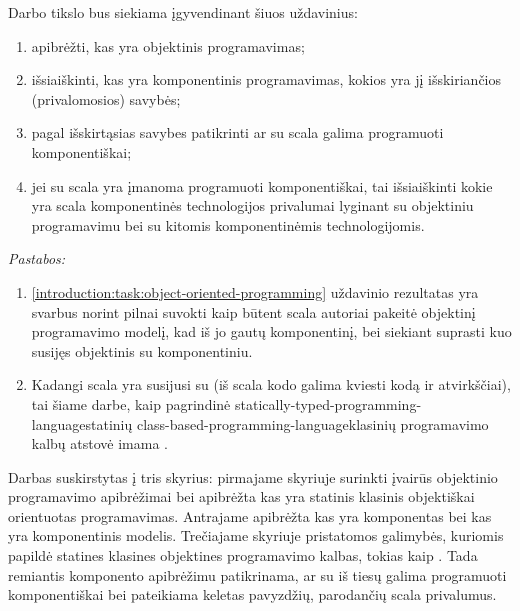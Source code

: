 Darbo tikslo bus siekiama įgyvendinant šiuos uždavinius:
\begin{enumerate}
  \item \label{introduction:task:object-oriented-programming}
    apibrėžti, kas yra objektinis programavimas;
  \item išsiaiškinti, kas yra komponentinis programavimas, kokios
    yra jį išskiriančios (privalomosios) savybės;
  \item pagal išskirtąsias savybes patikrinti ar su
    \gls{scala}{} galima programuoti komponentiškai;
  \item jei su \gls{scala}{} yra įmanoma programuoti
    komponentiškai, tai išsiaiškinti kokie yra
    \gls{scala}{} komponentinės technologijos
    privalumai lyginant su objektiniu programavimu bei su kitomis
    komponentinėmis technologijomis.
\end{enumerate}
\emph{Pastabos:}
\begin{enumerate}
  \item \ref{introduction:task:object-oriented-programming}
    uždavinio rezultatas yra svarbus norint pilnai suvokti kaip būtent
    \gls{scala}{} autoriai pakeitė objektinį programavimo
    modelį, kad iš jo gautų komponentinį, bei siekiant suprasti kuo
    susijęs objektinis su komponentiniu.
  \item Kadangi \gls{scala}{} yra susijusi su
     (iš \gls{scala}{} kodo galima
    kviesti  kodą ir atvirkščiai), tai šiame darbe,
    kaip pagrindinė \gls{statically-typed-programming-language}{statinių}
    \gls{class-based-programming-language}{klasinių}
     programavimo kalbų atstovė imama
    .
\end{enumerate}

Darbas suskirstytas į tris skyrius: pirmajame skyriuje surinkti
įvairūs objektinio programavimo apibrėžimai bei apibrėžta kas
yra statinis klasinis objektiškai orientuotas programavimas.
Antrajame apibrėžta kas yra komponentas bei kas yra komponentinis modelis.
Trečiajame skyriuje pristatomos galimybės, kuriomis 
papildė statines klasines objektines programavimo kalbas, tokias
kaip . Tada remiantis komponento apibrėžimu patikrinama, ar
su  iš tiesų galima programuoti komponentiškai bei
pateikiama keletas pavyzdžių, parodančių
\gls{scala}{} privalumus.

